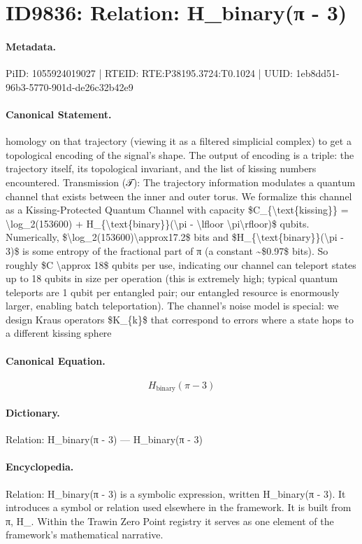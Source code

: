 \section*{ID9836: Relation: H\_binary(π - 3)}
\paragraph{Metadata.}
PiID: 1055924019027 | RTEID: RTE:P38195.3724:T0.1024 | UUID: 1eb8dd51-96b3-5770-901d-de26c32b42e9

\paragraph{Canonical Statement.}
homology on that trajectory (viewing it as a filtered simplicial complex) to get a topological encoding of the signal’s shape. The output of encoding is a triple: the trajectory itself, its topological invariant, and the list of kissing numbers encountered. Transmission (𝒯): The trajectory information modulates a quantum channel that exists between the inner and outer torus. We formalize this channel as a Kissing-Protected Quantum Channel with capacity \$C\_\{\textbackslash{}text\{kissing\}\} = \textbackslash{}log\_2(153600) + H\_\{\textbackslash{}text\{binary\}\}(\textbackslash{}pi - \textbackslash{}lfloor \textbackslash{}pi\textbackslash{}rfloor)\$ qubits. Numerically, \$\textbackslash{}log\_2(153600)\textbackslash{}approx17.2\$ bits and \$H\_\{\textbackslash{}text\{binary\}\}(\textbackslash{}pi - 3)\$ is some entropy of the fractional part of π (a constant \textasciitilde{}\$0.97\$ bits). So roughly \$C \textbackslash{}approx 18\$ qubits per use, indicating our channel can teleport states up to 18 qubits in size per operation (this is extremely high; typical quantum teleports are 1 qubit per entangled pair; our entangled resource is enormously larger, enabling batch teleportation). The channel’s noise model is special: we design Kraus operators \$K\_\{k\}\$ that correspond to errors where a state hops to a different kissing sphere

\paragraph{Canonical Equation.}
\[
H_{\text{binary}}(\pi - 3)
\]

\paragraph{Dictionary.}
Relation: H\_binary(π - 3) — H\_binary(π - 3)

\paragraph{Encyclopedia.}
Relation: H\_binary(π - 3) is a symbolic expression, written H\_binary(π - 3). It introduces a symbol or relation used elsewhere in the framework. It is built from π, H\_. Within the Trawin Zero Point registry it serves as one element of the framework's mathematical narrative.
